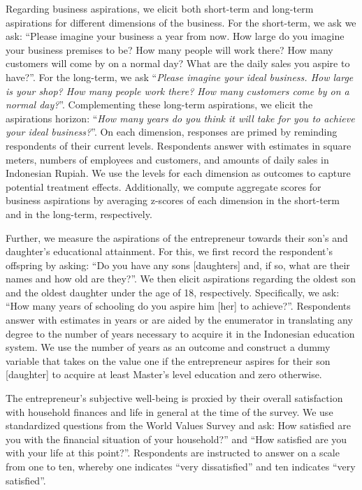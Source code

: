 \documentclass[11.5pt]{article}
\begin{document}
Regarding business aspirations, we elicit both short-term and long-term aspirations for different dimensions of the business. For the short-term, we ask we ask: ``Please imagine your business a year from now. How large do you imagine your business premises to be? How many people will work there? How many customers will come by on a normal day? What are the daily sales you aspire to have?''. For the long-term, we ask ``\emph{Please imagine your ideal business. How large is your shop? How many people work there? How many customers come by on a normal day?}''. Complementing these long-term aspirations, we elicit the aspirations horizon: ``\emph{How many years do you think it will take for you to achieve your ideal business?}''. On each dimension, responses are primed by reminding respondents of their current levels. Respondents answer with estimates in square meters, numbers of employees and customers, and amounts of daily sales in Indonesian Rupiah. We use the levels for each dimension as outcomes to capture potential treatment effects. Additionally, we compute aggregate scores for business aspirations by averaging z-scores of each dimension in the short-term and in the long-term, respectively.

Further, we measure the aspirations of the entrepreneur towards their son's and daughter's educational attainment. For this, we first record the respondent's offspring by asking: ``Do you have any sons [daughters] and, if so, what are their names and how old are they?''. We then elicit aspirations regarding the oldest son and the oldest daughter under the age of 18, respectively. Specifically, we ask: ``How many years of schooling do you aspire him [her] to achieve?''. Respondents answer with estimates in years or are aided by the enumerator in translating any degree to the number of years necessary to acquire it in the Indonesian education system. We use the number of years as an outcome and construct a dummy variable that takes on the value one if the entrepreneur aspires for their son [daughter] to acquire at least Master's level education and zero otherwise.

The entrepreneur's subjective well-being is proxied by their overall satisfaction with household finances and life in general at the time of the survey. We use standardized questions from the World Values Survey and ask: How satisfied are you with the financial situation of your household?'' and ``How satisfied are you with your life at this point?''. Respondents are instructed to answer on a scale from one to ten, whereby one indicates ``very dissatisfied'' and ten indicates ``very satisfied''.
\end{document}
